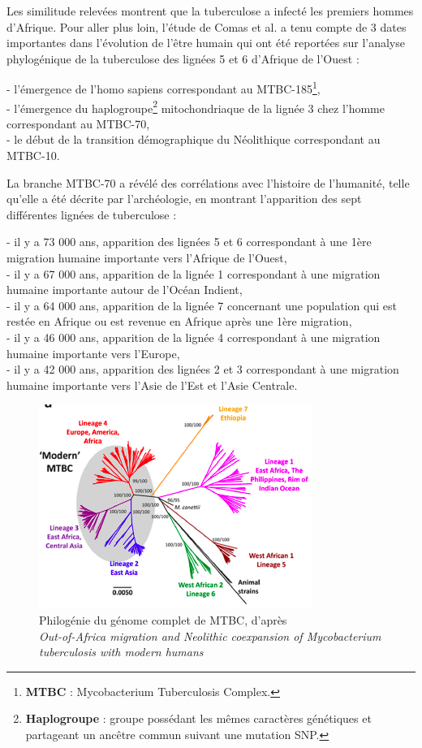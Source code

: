 \documentclass[twoside,a4paper,11pt,frenchb,openany]{report}
\begin{document}

Les similitude relevées montrent que la tuberculose a infecté les premiers hommes d'Afrique. Pour aller plus loin, l'étude de Comas et al. a tenu compte de 3 dates importantes dans l'évolution de l'être humain qui ont été reportées sur l'analyse phylogénique de la tuberculose des lignées 5 et 6 d'Afrique de l'Ouest :

- l'émergence de l'homo sapiens correspondant au MTBC-185\footnote{\textbf{MTBC} : Mycobacterium Tuberculosis Complex.},\\
- l'émergence du haplogroupe\footnote{\textbf{Haplogroupe} : groupe possédant les mêmes caractères génétiques et partageant un ancêtre commun suivant une mutation SNP.} mitochondriaque de la lignée 3 chez l'homme correspondant au MTBC-70,\\
- le début de la transition démographique du Néolithique correspondant au MTBC-10.

La branche MTBC-70 a révélé des corrélations avec l'histoire de l'humanité, telle qu'elle a été décrite par l'archéologie, en montrant l'apparition des sept différentes lignées de tuberculose :

- il y a 73 000 ans, apparition des lignées 5 et 6 correspondant à une 1ère migration humaine importante vers l'Afrique de l'Ouest,\\
- il y a 67 000 ans, apparition de la lignée 1 correspondant à une migration humaine importante autour de l'Océan Indient,\\
- il y a 64 000 ans, apparition de la lignée 7 concernant une population qui est restée en Afrique ou est revenue en Afrique après une 1ère migration,\\
- il y a 46 000 ans, apparition de la lignée 4 correspondant à une migration humaine importante vers l'Europe,\\
- il y a 42 000 ans, apparition des lignées 2 et 3 correspondant à une migration humaine importante vers l'Asie de l'Est et l'Asie Centrale. 

\begin{figure}[h!]
\includegraphics[scale=0.7]{worldlignee.png}
\caption{Philogénie du génome complet de MTBC, d'après\\ \textit{Out-of-Africa migration and Neolithic coexpansion of Mycobacterium\\tuberculosis with modern humans}}
\end{figure}
\end{document}
